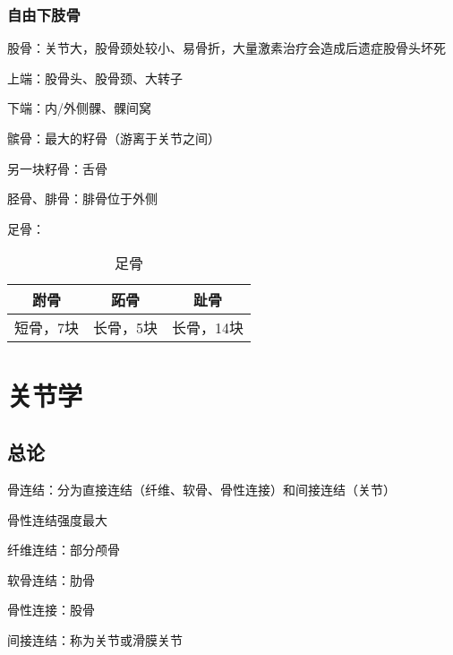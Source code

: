\subsubsection*{自由下肢骨}%
\label{subsub:自由下肢骨}
\begin{notation}
    股骨：关节大，股骨颈处较小、易骨折，大量激素治疗会造成后遗症股骨头坏死

    上端：股骨头、股骨颈、大转子

    下端：内/外侧髁、髁间窝
\end{notation}
\begin{notation}
    髌骨：最大的籽骨（游离于关节之间）

    另一块籽骨：舌骨
\end{notation}
\begin{notation}
    胫骨、腓骨：腓骨位于外侧
\end{notation}
\begin{notation}
    足骨：
    \begin{table}[htpb]
        \centering
        \caption{足骨}
        \label{tab:足骨}
        \begin{tabular}{ccc}
        \toprule
        跗骨 & 跖骨 & 趾骨\\
        \midrule
        短骨，7块 & 长骨，5块 & 长骨，14块\\
        \bottomrule
        \end{tabular}
    \end{table}
\end{notation}
\section{关节学}%
\label{sec:关节学}
\subsection{总论}%
\label{sub:关节学总论}
\begin{notation}
    骨连结：分为直接连结（纤维、软骨、骨性连接）和间接连结（关节）

    骨性连结强度最大

    纤维连结：部分颅骨

    软骨连结：肋骨

    骨性连接：股骨
\end{notation}
间接连结：称为关节或滑膜关节

